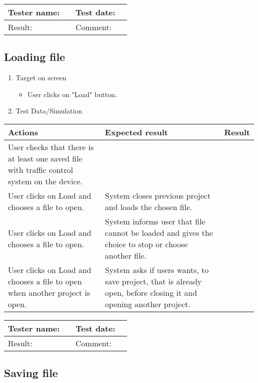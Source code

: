 \begin{tabularx}{\textwidth}{|p{3cm}X|p{3cm}X|}\hline
	Tester name: &  & Test date: & \\\hline
	Result: &  \pass & Comment: & \\\hline
\end{tabularx}



\subsection{Loading file}

\begin{enumerate}
	
	\item Target on screen
	\begin{itemize}
		\item User clicks on "Load" button.
	\end{itemize}
	\item Test Data/Simulation
\end{enumerate}
	\begin{tabularx}{\textwidth}{|X|X|p{2.5cm}|}\hline
		Actions & Expected result & Result \\\hline

		User checks that there is at least one saved file with traffic control system on the device.& &\pass \\\hline
		User clicks on Load and chooses a file to open. & System closes previous project and loads the chosen file.  & \pass \\\hline 
		User clicks on Load and chooses a file to open. & System informs user that file cannot be loaded and gives the choice
		to stop or choose another file. & \pass \\\hline 
		User clicks on Load and chooses a file to open when another project is open. & System asks if users wants, to save project, that is already open, before closing it and opening another project. & \pass \\\hline 
	\end{tabularx}

\begin{tabularx}{\textwidth}{|p{3cm}X|p{3cm}X|}\hline
	Tester name: &  & Test date: & \\\hline
	Result: &  \pass & Comment: & \\\hline
\end{tabularx}

\newpage
\subsection{Saving file}

